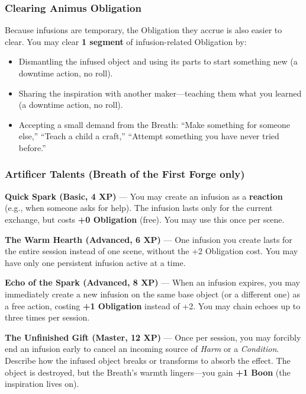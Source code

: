 \subsubsection*{Clearing Animus Obligation}
Because infusions are temporary, the Obligation they accrue is also easier to clear. You may clear \textbf{1 segment} of infusion-related Obligation by:
\begin{itemize}
  \item Dismantling the infused object and using its parts to start something new (a downtime action, no roll).
  \item Sharing the inspiration with another maker---teaching them what you learned (a downtime action, no roll).
  \item Accepting a small demand from the Breath: ``Make something for someone else,'' ``Teach a child a craft,'' ``Attempt something you have never tried before.''
\end{itemize}

\subsubsection*{Artificer Talents (Breath of the First Forge only)}
\textbf{Quick Spark (Basic, 4 XP)} --- You may create an infusion as a \textbf{reaction} (e.g., when someone asks for help). The infusion lasts only for the current exchange, but costs \textbf{+0 Obligation} (free). You may use this once per scene.

\textbf{The Warm Hearth (Advanced, 6 XP)} --- One infusion you create lasts for the entire session instead of one scene, without the +2 Obligation cost. You may have only one persistent infusion active at a time.

\textbf{Echo of the Spark (Advanced, 8 XP)} --- When an infusion expires, you may immediately create a new infusion on the same base object (or a different one) as a free action, costing \textbf{+1 Obligation} instead of +2. You may chain echoes up to three times per session.

\textbf{The Unfinished Gift (Master, 12 XP)} --- Once per session, you may forcibly end an infusion early to cancel an incoming source of \textit{Harm} or a \textit{Condition}. Describe how the infused object breaks or transforms to absorb the effect. The object is destroyed, but the Breath's warmth lingers---you gain \textbf{+1 Boon} (the inspiration lives on).


